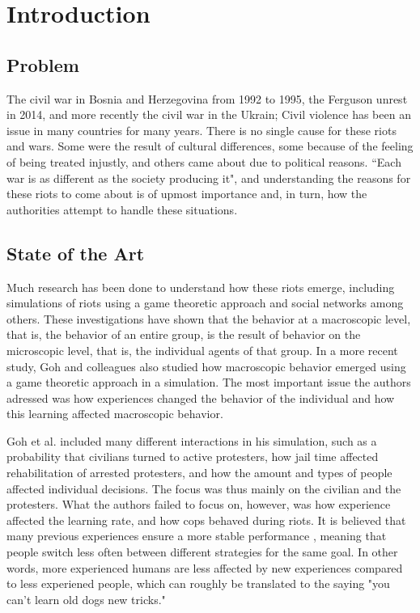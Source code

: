 \section{Introduction}
\subsection{Problem}
The civil war in Bosnia and Herzegovina from 1992 to 1995, the Ferguson unrest in 2014, and more recently the civil war in the Ukrain; Civil violence has been an issue in many countries for many years. There is no single cause for these riots and wars. Some were the result of cultural differences, some because of the feeling of being treated injustly, and others came about due to political reasons. ``Each war is as different as the society producing it", and understanding the reasons for these riots to come about is of upmost importance \citep*{sambanis2001ethnic} and, in turn, how the authorities attempt to handle these situations. 

\subsection{State of the Art}
Much research has been done to understand how these riots emerge, including simulations of riots using a game theoretic approach \citep*{myerson1991game} and social networks \citep*{gulden2002spatial} among others. These investigations have shown that the behavior at a macroscopic level, that is, the behavior of an entire group, is the result of behavior on the microscopic level, that is, the individual agents of that group. In a more recent study, Goh and colleagues \citep*{goh2006modeling} also studied how macroscopic behavior emerged using a game theoretic approach in a simulation. The most important issue the authors adressed was how experiences changed the behavior of the individual and how this learning affected macroscopic behavior. 

Goh et al. included many different interactions in his simulation, such as a probability that civilians turned to active protesters, how jail time affected rehabilitation of arrested protesters, and how the amount and types of people affected individual decisions. The focus was thus mainly on the civilian and the protesters. What the authors failed to focus on, however, was how experience affected the learning rate, and how cops behaved during riots. It is believed that many previous experiences ensure a more stable performance \citep{anderson2007mind,nason2005soar}, meaning that people switch less often between different strategies for the same goal. In other words, more experienced humans are less affected by new experiences compared to less experiened people, which can roughly be translated to the saying "you can't learn old dogs new tricks." 

